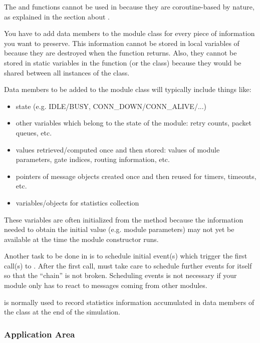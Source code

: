 The  and  functions cannot be used in
 because they are coroutine-based by nature, as
explained in the section about .

You have to add data members to the module class for every piece
of information you want to preserve. This information cannot
be stored in local variables of  because they
are destroyed when the function returns. Also, they cannot be
stored in static variables in the function (or the class) because
they would be shared between all instances of the class.

Data members to be added to the module class will typically include
things like:

\begin{itemize}
  \item state (e.g. IDLE/BUSY, CONN\_DOWN/CONN\_ALIVE/...)
  \item other variables which belong to the state of the module: retry
    counts, packet queues, etc.
  \item values retrieved/computed once and then stored: values of module
    parameters, gate indices, routing information, etc.
  \item pointers of message objects created once and then reused for
    timers, timeouts, etc.
  \item variables/objects for statistics collection
\end{itemize}

These variables are often initialized from the 
method because the information needed to obtain the initial value
(e.g. module parameters) may not yet be available at the time the
module constructor runs.

Another task to be done in  is to schedule
initial event(s) which trigger the first call(s)
to .  After the first call,
 must take care to schedule further events for
itself so that the ``chain'' is not broken. Scheduling events is not
necessary if your module only has to react to messages coming from
other modules.

 is normally used to record statistics information
accumulated in data members of the class at the end of the simulation.


\subsubsection{Application Area}
\label{sec:simple-modules:handlemessage:application-area}


